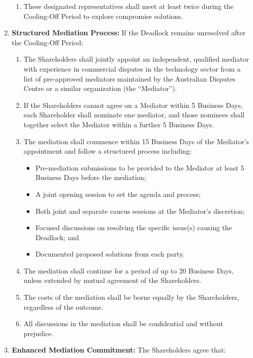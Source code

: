 \begin{enumerate}[label=(\alph*)]
\begin{enumerate}[label=(\roman*)]
    \item These designated representatives shall meet at least twice during the Cooling-Off Period to explore compromise solutions.
    \end{enumerate}
\item \textbf{Structured Mediation Process:} If the Deadlock remains unresolved after the Cooling-Off Period:
    \begin{enumerate}[label=(\roman*)]
    \item The Shareholders shall jointly appoint an independent, qualified mediator with experience in commercial disputes in the technology sector from a list of pre-approved mediators maintained by the Australian Disputes Centre or a similar organization (the ``Mediator'').
    \item If the Shareholders cannot agree on a Mediator within 5 Business Days, each Shareholder shall nominate one mediator, and those nominees shall together select the Mediator within a further 5 Business Days.
    \item The mediation shall commence within 15 Business Days of the Mediator's appointment and follow a structured process including:
        \begin{itemize}
        \item Pre-mediation submissions to be provided to the Mediator at least 5 Business Days before the mediation;
        \item A joint opening session to set the agenda and process;
        \item Both joint and separate caucus sessions at the Mediator's discretion;
        \item Focused discussions on resolving the specific issue(s) causing the Deadlock; and
        \item Documented proposed solutions from each party.
        \end{itemize}
    \item The mediation shall continue for a period of up to 20 Business Days, unless extended by mutual agreement of the Shareholders.
    \item The costs of the mediation shall be borne equally by the Shareholders, regardless of the outcome.
    \item All discussions in the mediation shall be confidential and without prejudice.
    \end{enumerate}
    \item \textbf{Enhanced Mediation Commitment:} The Shareholders agree that:
    \begin{enumerate}[label=(\roman*)]

\end{enumerate}
\end{enumerate}
